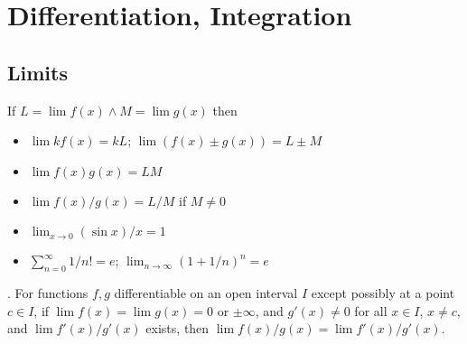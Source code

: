 \documentclass{slnotes}
\begin{document}
\chapter{Differentiation, Integration}
\section{Limits}
If \(L = \lim f(x) \land M = \lim g(x)\) then \begin{itemize}
\item \(\lim kf(x) = kL\); \(\lim (f(x) \pm g(x)) = L \pm M\)
\item \(\lim f(x)g(x) = LM\)
\item \(\lim f(x)/g(x) = L/M\) if \(M \neq 0\)
\item \(\lim_{x\to0} (\sin x)/x = 1\)
\item \(\sum^\infty_{n=0} 1/n! = e\); \(\lim_{n\to\infty} (1+1/n)^n = e\)
\end{itemize}

. For functions \(f, g\) differentiable on an open interval \(I\) except possibly at a point \(c \in I\), if \(\lim f(x) = \lim g(x) = 0\) or \(\pm\infty\), and \(g'(x) \neq 0\) for all \(x \in I\), \(x \neq c\), and \(\lim f'(x)/g'(x)\) exists, then \(\lim f(x)/g(x) = \lim f'(x)/g'(x)\).
\end{document}
